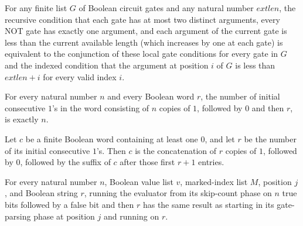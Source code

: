 \begin{theorem}
\label{BoolCircuit.CircuitEval.gatesOK_iff}
\leanok
{}
For any finite list $G$ of Boolean circuit gates and any natural number $	ext{len}$, the
recursive condition that each gate has at most two distinct arguments, every NOT gate
has exactly one argument, and each argument of the current gate is less than the current
available length (which increases by one at each gate) is equivalent to the conjunction
of these local gate conditions for every gate in $G$ and the indexed condition that the
argument at position $i$ of $G$ is less than $	ext{len}+i$ for every valid index $i$.
\end{theorem}

\begin{theorem}
\label{BoolCircuit.CircuitEval.leadOnes_replicate}
\leanok
{}
For every natural number $n$ and every Boolean word $r$, the number of initial
consecutive $1$'s in the word consisting of $n$ copies of $1$, followed by $0$ and then
$r$, is exactly $n$.
\end{theorem}

\begin{theorem}
\label{BoolCircuit.CircuitEval.eq_replicate_leadOnes}
\leanok
{}
Let $c$ be a finite Boolean word containing at least one $0$, and let $r$ be the number
of its initial consecutive $1$'s. Then $c$ is the concatenation of $r$ copies of $1$,
followed by $0$, followed by the suffix of $c$ after those first $r+1$ entries.
\end{theorem}

\begin{theorem}
\label{BoolCircuit.CircuitEval.absRun_skipN}
\leanok
{}
For every natural number $n$, Boolean value list $v$, marked-index list $M$, position
$j$, and Boolean string $r$, running the evaluator from its skip-count phase on $n$ true
bits followed by a false bit and then $r$ has the same result as starting in its
gate-parsing phase at position $j$ and running on $r$.
\end{theorem}

